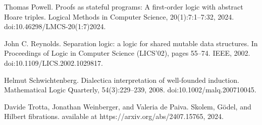 \par\noindent  [36]  Thomas Powell.  Proofs as stateful programs: A first-order logic with abstract Hoare triples.  Logical Methods in Computer Science, 20(1):7:1–7:32, 2024.  doi:10.46298/LMCS-20(1:7)2024.  
 
\par\noindent  [37]  John C. Reynolds.  Separation logic: a logic for shared mutable data structures.  In Proceedings of Logic in Computer Science (LICS’02), pages 55–74. IEEE, 2002.  doi:10.1109/LICS.2002.1029817.  
 
\par\noindent  [38]  Helmut Schwichtenberg.  Dialectica interpretation of well-founded induction.  Mathematical Logic Quarterly, 54(3):229–239, 2008.  doi:10.1002/malq.200710045.  
 
\par\noindent  [39]  Davide Trotta, Jonathan Weinberger, and Valeria de Paiva.  Skolem, Gödel, and Hilbert fibrations.  available at https://arxiv.org/abs/2407.15765, 2024.  
  

